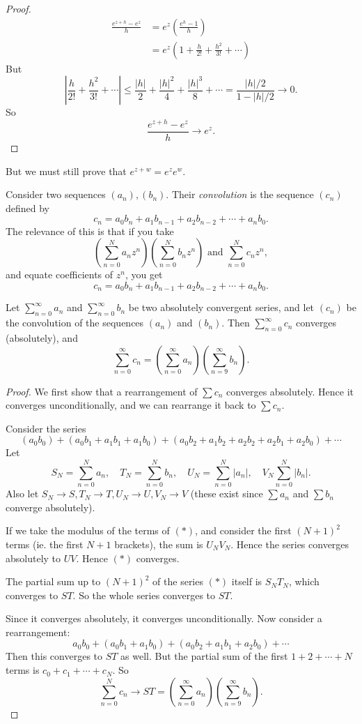 \documentclass[a4paper]{article}
\begin{document}
\begin{proof}
  \begin{align*}
    \frac{e^{z + h} - e^z}{h} &= e^z \left(\frac{e^h - 1}{h}\right)\\
    &= e^z\left(1 + \frac{h}{2!} + \frac{h^2}{3!} + \cdots\right)
  \end{align*}
  But
  \[
    \left|\frac{h}{2!} + \frac{h^2}{3!} + \cdots \right| \leq \frac{|h|}{2} + \frac{|h|^2}{4} + \frac{|h|^3}{8} + \cdots = \frac{|h|/2}{1 - |h|/2} \to 0.
  \]
  So
  \[
    \frac{e^{z + h} - e^z}{h} \to e^z.
  \]
\end{proof}

But we must still prove that $e^{z + w} = e^ze^w$.

Consider two sequences $(a_n), (b_n)$. Their \emph{convolution} is the sequence $(c_n)$ defined by
\[
  c_n = a_0b_n + a_1b_{n - 1} + a_2b_{n - 2} + \cdots + a_nb_0.
\]
The relevance of this is that if you take
\[
  \left(\sum_{n = 0}^N a_nz^n\right)\left(\sum_{n = 0}^N b_nz^n\right)\text{ and }\sum_{n = 0}^N c_n z^n,
\]
and equate coefficients of $z^n$, you get
\[
  c_n = a_0b_n + a_1b_{n - 1} + a_2b_{n - 2} + \cdots + a_nb_0.
\]
\begin{thm}
  Let $\sum_{n = 0}^\infty a_n$ and $\sum_{n = 0}^\infty b_n$ be two absolutely convergent series, and let $(c_n)$ be the convolution of the sequences $(a_n)$ and $(b_n)$. Then $\sum_{n = 0}^\infty c_n$ converges (absolutely), and
  \[
    \sum_{n = 0}^{\infty} c_n = \left(\sum_{n = 0}^\infty a_n\right)\left(\sum_{n = 9}^\infty b_n \right).
  \]
\end{thm}

\begin{proof}
  We first show that a rearrangement of $\sum c_n$ converges absolutely. Hence it converges unconditionally, and we can rearrange it back to $\sum c_n$.

  Consider the series
  \[
    (a_0b_0) + (a_0 b_1 + a_1b_1 + a_1b_0) + (a_0 b_2 + a_1 b_2 + a_2b_2 + a_2b_1 + a_2b_0) + \cdots\tag{$*$}
  \]
  Let
  \[
    S_N = \sum_{n = 0}^{N}a_n, \quad T_N = \sum_{n = 0}^N b_n,\quad U_N = \sum_{n = 0}^N | a_n|,\quad V_N \sum_{n = 0}^N|b_n|.
  \]
  Also let $S_N \to S, T_N \to T, U_N \to U, V_N \to V$ (these exist since $\sum a_n$ and $\sum b_n$ converge absolutely).

  If we take the modulus of the terms of $(*)$, and consider the first $(N + 1)^2$ terms (ie. the first $N + 1$ brackets), the sum is $U_NV_N$. Hence the series converges absolutely to $UV$. Hence $(*)$ converges.

  The partial sum up to $(N + 1)^2$ of the series $(*)$ itself is $S_NT_N$, which converges to $ST$. So the whole series converges to $ST$.

  Since it converges absolutely, it converges unconditionally. Now consider a rearrangement:
  \[
    a_0 b_0 + (a_0b_1 + a_1b_0) + (a_0b_2 + a_1b_1 + a_2b_0) + \cdots
  \]
  Then this converges to $ST$ as well. But the partial sum of the first $1 + 2 + \cdots + N$ terms is $c_0 + c_1 + \cdots + c_N$. So
  \[
    \sum_{n = 0}^N c_n \to ST = \left(\sum_{n = 0}^\infty a_n\right)\left(\sum_{n = 9}^\infty b_n \right).
  \]
\end{proof}
\end{document}
